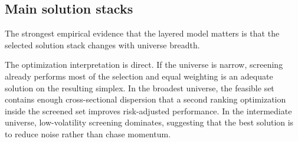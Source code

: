 \documentclass[journal,10pt]{IEEEtran}
\begin{document}
\subsection{Main solution stacks}
The strongest empirical evidence that the layered model matters is that the selected solution stack changes with universe breadth.
\begin{table}[!t]
\centering
\caption{Best screen/controller stack by candidate-universe breadth. Values are mean walk-forward metrics at 10 bps transaction cost.}
\label{tab:winners_math}
\small
{}
\end{table}
The optimization interpretation is direct. If the universe is narrow, screening already performs most of the selection and equal weighting is an adequate solution on the resulting simplex. In the broadest universe, the feasible set contains enough cross-sectional dispersion that a second ranking optimization inside the screened set improves risk-adjusted performance. In the intermediate universe, low-volatility screening dominates, suggesting that the best solution is to reduce noise rather than chase momentum.
\end{document}
